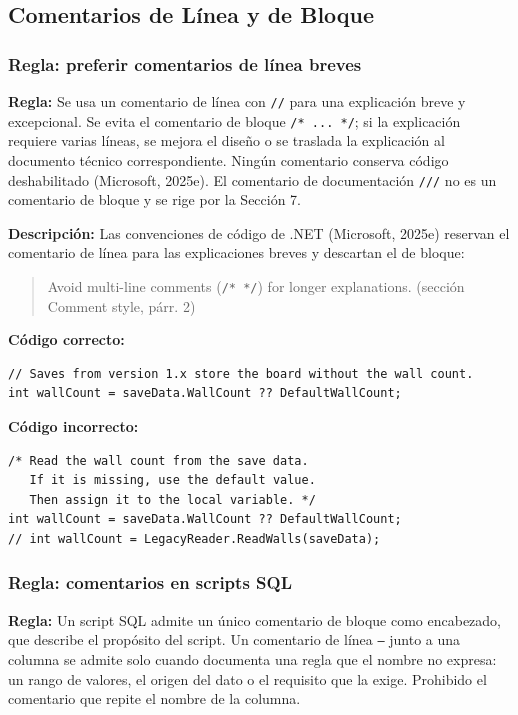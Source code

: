 \subsection{Comentarios de Línea y de Bloque}

\subsubsection{Regla: preferir comentarios de línea breves}

\textbf{Regla:} Se usa un comentario de línea con \texttt{//} para una explicación breve y excepcional. Se evita el comentario de bloque \texttt{/* ... */}; si la explicación requiere varias líneas, se mejora el diseño o se traslada la explicación al documento técnico correspondiente. Ningún comentario conserva código deshabilitado (Microsoft, 2025e). El comentario de documentación \texttt{///} no es un comentario de bloque y se rige por la Sección 7.

\textbf{Descripción:} Las convenciones de código de .NET (Microsoft, 2025e) reservan el comentario de línea para las explicaciones breves y descartan el de bloque:
\begin{quote}
Avoid multi-line comments (\texttt{/* */}) for longer explanations. (sección Comment style, párr. 2)
\end{quote}

\textbf{Código correcto:}
\begin{lstlisting}[style=csharpstyle]
// Saves from version 1.x store the board without the wall count.
int wallCount = saveData.WallCount ?? DefaultWallCount;
\end{lstlisting}

\textbf{Código incorrecto:}
\begin{lstlisting}[style=csharpstyle]
/* Read the wall count from the save data.
   If it is missing, use the default value.
   Then assign it to the local variable. */
int wallCount = saveData.WallCount ?? DefaultWallCount;
// int wallCount = LegacyReader.ReadWalls(saveData);
\end{lstlisting}

\subsubsection{Regla: comentarios en scripts SQL}

\textbf{Regla:} Un script SQL admite un único comentario de bloque como encabezado, que describe el propósito del script. Un comentario de línea \texttt{--} junto a una columna se admite solo cuando documenta una regla que el nombre no expresa: un rango de valores, el origen del dato o el requisito que la exige. Prohibido el comentario que repite el nombre de la columna.

